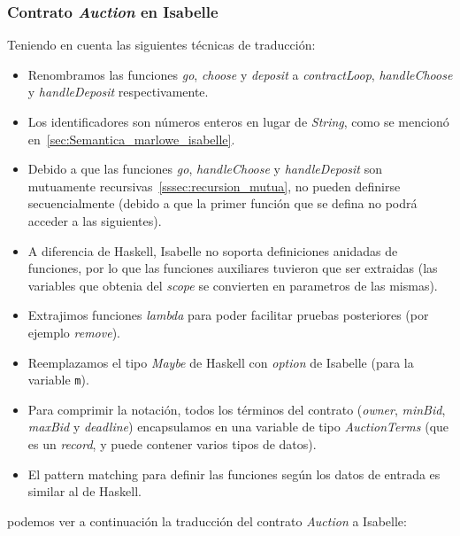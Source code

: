 \documentclass[12pt]{book}
\begin{document}
\subsubsection{Contrato \textit{Auction} en Isabelle}

Teniendo en cuenta las siguientes técnicas de traducción:

\begin{itemize}
    \item Renombramos las funciones \textit{go}, \textit{choose} y \textit{deposit} a \textit{contractLoop}, \textit{handleChoose} y \textit{handleDeposit} respectivamente.

    \item Los identificadores son números enteros en lugar de \textit{String}, como se mencionó en~\ref{sec:Semantica_marlowe_isabelle}.

    \item Debido a que las funciones \textit{go}, \textit{handleChoose} y \textit{handleDeposit} son mutuamente recursivas~\ref{sssec:recursion_mutua}, no pueden definirse secuencialmente (debido a que la primer función que se defina no podrá acceder a las siguientes). 

    \item A diferencia de Haskell, Isabelle no soporta definiciones anidadas de funciones, por lo que las funciones auxiliares tuvieron que ser extraidas (las variables que obtenia del \textit{scope} se convierten en parametros de las mismas).

    \item Extrajimos funciones \textit{lambda} para poder facilitar pruebas posteriores (por ejemplo \textit{remove}).

    \item Reemplazamos el tipo \textit{Maybe} de Haskell con \textit{option} de Isabelle (para la variable \texttt{m}).
    \item Para comprimir la notación, todos los términos del contrato (\textit{owner}, \textit{minBid}, \textit{maxBid} y \textit{deadline}) encapsulamos en una variable de tipo \textit{AuctionTerms} (que es un \textit{record}, y puede contener varios tipos de datos).

    \item El pattern matching para definir las funciones según los datos de entrada es similar al de Haskell.
         
\end{itemize}

podemos ver a continuación la traducción del contrato \textit{Auction} a Isabelle:
\end{document}
